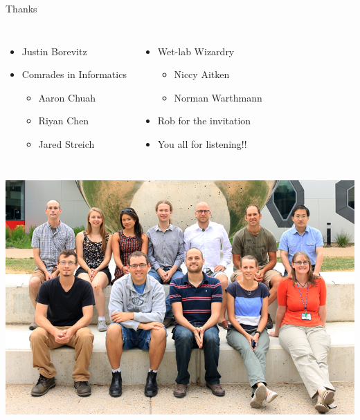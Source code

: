 \documentclass{beamer}
\begin{document}
\begin{frame}{Thanks}
  \begin{columns}
    \begin{itemize}
      \item Justin Borevitz
      \item Comrades in Informatics
      \begin{itemize}
        \item Aaron Chuah
        \item Riyan Chen
        \item Jared Streich
      \end{itemize}
    \end{itemize}
    \begin{itemize}
      \item Wet-lab Wizardry
      \begin{itemize}
        \item Niccy Aitken
        \item Norman Warthmann
      \end{itemize}
    \item Rob for the invitation
    \item You all for listening!!
    \end{itemize}
  \end{columns}
  \vfill
  \begin{columns}
    \centering
    \includegraphics[width=\textwidth]{img/lab.jpg}
    \centering

\end{columns}
\end{frame}
\end{document}
